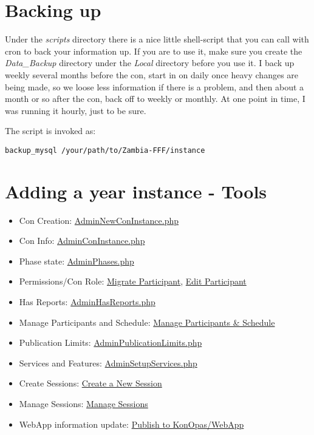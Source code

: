 \documentclass[captions=tablesignature]{scrartcl}
\begin{document}
\section{Backing up}
\label{sec-9}
Under the \emph{scripts} directory there is a nice little shell-script
that you can call with cron to back your information up.  If you are
to use it, make sure you create the \emph{Data\_Backup} directory under
the \emph{Local} directory before you use it.  I back up weekly several
months before the con, start in on daily once heavy changes are
being made, so we loose less information if there is a problem, and
then about a month or so after the con, back off to weekly or
monthly.  At one point in time, I was running it hourly, just to be
sure.

The script is invoked as:
\begin{verbatim}
backup_mysql /your/path/to/Zambia-FFF/instance
\end{verbatim}

\section{Adding a year instance - Tools}
\label{sec-10}
\begin{itemize}
\item Con Creation: \href{../webpages/AdminNewConInstance.php}{AdminNewConInstance.php}
\item Con Info: \href{../webpages/AdminConInstance.php}{AdminConInstance.php}
\item Phase state: \href{../webpages/AdminPhases.php}{AdminPhases.php}
\item Permissions/Con Role: \href{../webpages/StaffEditCreateParticipant.php?action=migrate}{Migrate Participant}, \href{../webpages/StaffEditCreateParticipant.php?action=edit}{Edit Participant}
\item Has Reports: \href{../webpages/AdminHasReports.php}{AdminHasReports.php}
\item Manage Participants and Schedule: \href{../webpages/StaffManageParticipants.php}{Manage Participants \& Schedule}
\item Publication Limits: \href{../webpages/AdminPublicationLimits.php}{AdminPublicationLimits.php}
\item Services and Features: \href{../webpages/AdminSetupServices.php}{AdminSetupServices.php}
\item Create Sessions: \href{../webpages/CreateSession.php}{Create a New Session}
\item Manage Sessions: \href{../webpages/StaffManageSessions.php}{Manage Sessions}
\item WebApp information update: \href{../webpages/KonOpasData.php}{Publish to KonOpas/WebApp}
\end{itemize}
\end{document}
